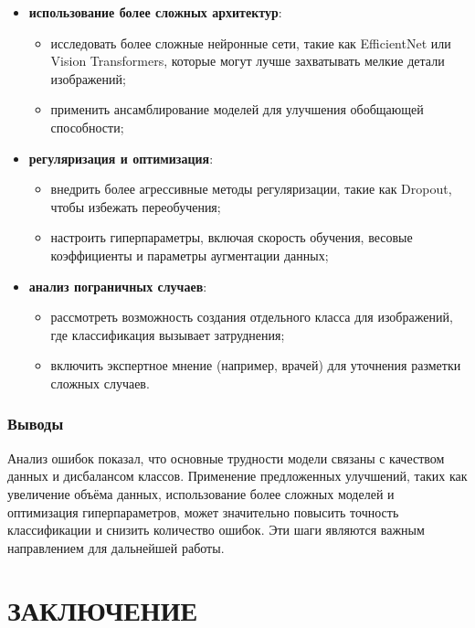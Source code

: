 {\begin{itemize}
        \item \textbf{использование более сложных архитектур}:
        \begin{itemize}
            \item исследовать более сложные нейронные сети, такие как EfficientNet или Vision  Transformers, которые могут лучше захватывать мелкие детали изображений;
            \item применить ансамблирование моделей для улучшения обобщающей способности;
        \end{itemize}
        
        \item \textbf{регуляризация и оптимизация}:
        \begin{itemize}
            \item внедрить более агрессивные методы регуляризации, такие как Dropout, чтобы избежать переобучения;
            \item настроить гиперпараметры, включая скорость обучения, весовые коэффициенты и параметры аугментации данных;
        \end{itemize}
        
        \item \textbf{анализ пограничных случаев}:
        \begin{itemize}
            \item рассмотреть возможность создания отдельного класса для изображений, где классификация вызывает затруднения;
            \item включить экспертное мнение (например, врачей) для уточнения разметки сложных случаев.
        \end{itemize}
    \end{itemize}

    \subsubsection*{Выводы}

    Анализ ошибок показал, что основные трудности модели связаны с качеством данных и дисбалансом классов. Применение предложенных улучшений, таких как увеличение объёма данных, использование более сложных моделей и оптимизация гиперпараметров, может значительно повысить точность классификации и снизить количество ошибок. Эти шаги являются важным направлением для дальнейшей работы.


\newpage
\section*{ЗАКЛЮЧЕНИЕ}

}
